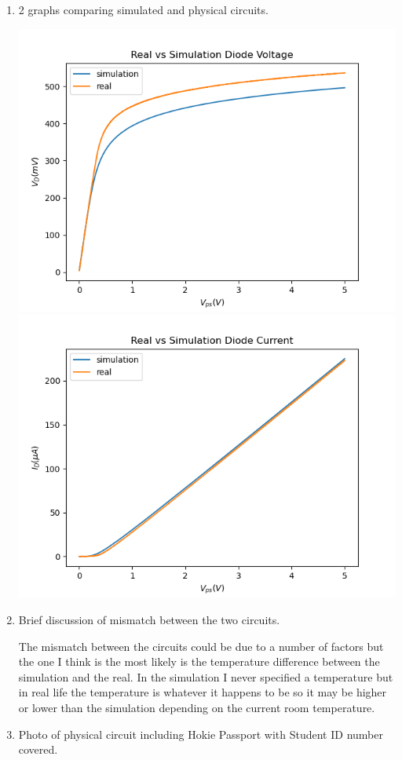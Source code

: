 \documentclass{article}
\begin{document}
\begin{enumerate}
    \item 2 graphs comparing simulated and physical circuits.
        \begin{center}
            \includegraphics[width = .445\textwidth]{vd.png}
            \includegraphics[width = .445\textwidth]{id.png}
        \end{center}
    \item Brief discussion of mismatch between the two circuits.
    \begin{center}
    The mismatch between the circuits could be due to a number of factors but the one I think is the most likely is the temperature difference between the simulation and the real. In the simulation I never specified a temperature but in real life the temperature is whatever it happens to be so it may be higher or lower than the simulation depending on the current room temperature.
    \end{center}
    \item Photo of physical circuit including Hokie Passport with Student ID number covered.
    \begin{center}

\end{center}
\end{enumerate}
\end{document}
